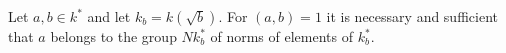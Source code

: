 Let $a, b \in k^*$ and let $k_b = k(\sqrt{b})$. For $(a, b) = 1$ it is necessary and sufficient that $a$ belongs to the group $N k_b^*$ of norms of elements of $k_b^*$.
